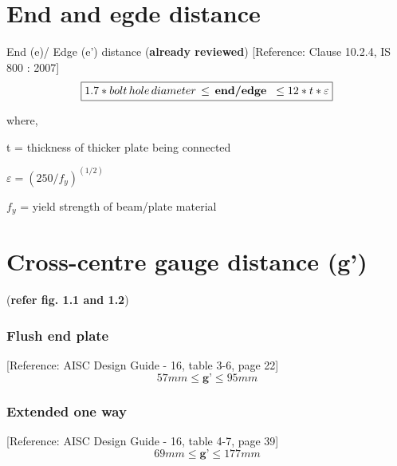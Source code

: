 \documentclass[11.5pt,a4paper,oneside]{report}
\begin{document}
\begin{Form}
\section{End and egde distance}
				
		\large {End (e)/ Edge (e') distance (\textbf{already reviewed}) [Reference: Clause 10.2.4, IS 800 : 2007]} \\
				\begin{equation}
				\boxed{ 1.7 * bolt\,hole\, diameter\, \leq \textbf{\,end/edge \,} \leq 12*t*\varepsilon }
				\end{equation}
				
				\hspace{10mm}
				where,
				
				\hspace{30mm}
				t = thickness of thicker plate being connected
				
				\hspace{30mm}
				$\varepsilon = (250 / f_{y}) ^ {(1/2)}$ 
				
				\hspace{30mm}
				$f_{y}$ = yield strength of beam/plate material 				 
			
			\vspace{2mm}
				
\section{Cross-centre gauge distance (g')} 
(\textbf{refer fig. 1.1 and 1.2}) \\

		\subsubsection{Flush end plate}
		[Reference: AISC Design Guide - 16, table 3-6, page 22]
		\begin{equation}
		\boxed{ 57 mm \leq \textbf{g'} \leq 95 mm }
		\end{equation}
		
		\subsubsection{Extended one way}
		[Reference: AISC Design Guide - 16, table 4-7, page 39]
		\begin{equation}
			\boxed{ 69 mm \leq \textbf{g'} \leq 177 mm }
		\end{equation}


\end{Form}
\end{document}
